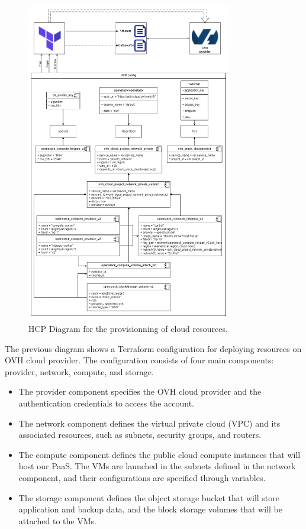 \begin{figure}[H]\centering
\includegraphics[width=0.8\textwidth]{assets/f14.png}
\caption{HCP Diagram for the provisionning of cloud resources.}
\label{fig:fig14}
\end{figure}
\newpage
\hspace{7mm}The previous diagram shows a Terraform configuration for deploying resources on OVH cloud provider. The configuration consists of four main components: provider, network, compute, and storage. 

\begin{itemize}[label={--}]
\item The provider component specifies the OVH cloud provider and the authentication credentials to access the account. 
\item The network component defines the virtual private cloud (VPC) and its associated resources, such as subnets, security groups, and routers. 
\item The compute component defines the public cloud compute instances that will host our PaaS. The VMs are launched in the subnets defined in the network component, and their configurations are specified through variables. 
\item The storage component defines the object storage bucket that will store application and backup data, and the block storage volumes that will be attached to the VMs. 
\end{itemize}

